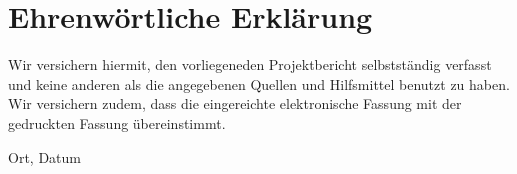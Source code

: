 \clearpage
\chapter*{Ehrenwörtliche Erklärung}


Wir versichern hiermit, den vorliegeneden Projektbericht selbstständig verfasst und 
keine anderen als die angegebenen Quellen und Hilfsmittel benutzt zu haben. Wir versichern zudem, dass die eingereichte elektronische 
Fassung mit der gedruckten Fassung übereinstimmt.

\vspace{3cm}
Ort, Datum \hfill \DerAutorDerArbeit
